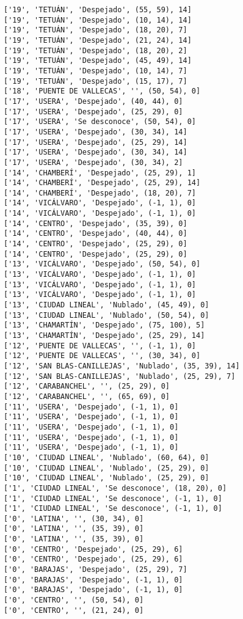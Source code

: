 \documentclass[11pt]{article}
\begin{document}
\begin{Verbatim}[commandchars=\\\{\}]
['19', 'TETUÁN', 'Despejado', (55, 59), 14]
['19', 'TETUÁN', 'Despejado', (10, 14), 14]
['19', 'TETUÁN', 'Despejado', (18, 20), 7]
['19', 'TETUÁN', 'Despejado', (21, 24), 14]
['19', 'TETUÁN', 'Despejado', (18, 20), 2]
['19', 'TETUÁN', 'Despejado', (45, 49), 14]
['19', 'TETUÁN', 'Despejado', (10, 14), 7]
['19', 'TETUÁN', 'Despejado', (15, 17), 7]
['18', 'PUENTE DE VALLECAS', '', (50, 54), 0]
['17', 'USERA', 'Despejado', (40, 44), 0]
['17', 'USERA', 'Despejado', (25, 29), 0]
['17', 'USERA', 'Se desconoce', (50, 54), 0]
['17', 'USERA', 'Despejado', (30, 34), 14]
['17', 'USERA', 'Despejado', (25, 29), 14]
['17', 'USERA', 'Despejado', (30, 34), 14]
['17', 'USERA', 'Despejado', (30, 34), 2]
['14', 'CHAMBERÍ', 'Despejado', (25, 29), 1]
['14', 'CHAMBERÍ', 'Despejado', (25, 29), 14]
['14', 'CHAMBERÍ', 'Despejado', (18, 20), 7]
['14', 'VICÁLVARO', 'Despejado', (-1, 1), 0]
['14', 'VICÁLVARO', 'Despejado', (-1, 1), 0]
['14', 'CENTRO', 'Despejado', (35, 39), 0]
['14', 'CENTRO', 'Despejado', (40, 44), 0]
['14', 'CENTRO', 'Despejado', (25, 29), 0]
['14', 'CENTRO', 'Despejado', (25, 29), 0]
['13', 'VICÁLVARO', 'Despejado', (50, 54), 0]
['13', 'VICÁLVARO', 'Despejado', (-1, 1), 0]
['13', 'VICÁLVARO', 'Despejado', (-1, 1), 0]
['13', 'VICÁLVARO', 'Despejado', (-1, 1), 0]
['13', 'CIUDAD LINEAL', 'Nublado', (45, 49), 0]
['13', 'CIUDAD LINEAL', 'Nublado', (50, 54), 0]
['13', 'CHAMARTÍN', 'Despejado', (75, 100), 5]
['13', 'CHAMARTÍN', 'Despejado', (25, 29), 14]
['12', 'PUENTE DE VALLECAS', '', (-1, 1), 0]
['12', 'PUENTE DE VALLECAS', '', (30, 34), 0]
['12', 'SAN BLAS-CANILLEJAS', 'Nublado', (35, 39), 14]
['12', 'SAN BLAS-CANILLEJAS', 'Nublado', (25, 29), 7]
['12', 'CARABANCHEL', '', (25, 29), 0]
['12', 'CARABANCHEL', '', (65, 69), 0]
['11', 'USERA', 'Despejado', (-1, 1), 0]
['11', 'USERA', 'Despejado', (-1, 1), 0]
['11', 'USERA', 'Despejado', (-1, 1), 0]
['11', 'USERA', 'Despejado', (-1, 1), 0]
['11', 'USERA', 'Despejado', (-1, 1), 0]
['10', 'CIUDAD LINEAL', 'Nublado', (60, 64), 0]
['10', 'CIUDAD LINEAL', 'Nublado', (25, 29), 0]
['10', 'CIUDAD LINEAL', 'Nublado', (25, 29), 0]
['1', 'CIUDAD LINEAL', 'Se desconoce', (18, 20), 0]
['1', 'CIUDAD LINEAL', 'Se desconoce', (-1, 1), 0]
['1', 'CIUDAD LINEAL', 'Se desconoce', (-1, 1), 0]
['0', 'LATINA', '', (30, 34), 0]
['0', 'LATINA', '', (35, 39), 0]
['0', 'LATINA', '', (35, 39), 0]
['0', 'CENTRO', 'Despejado', (25, 29), 6]
['0', 'CENTRO', 'Despejado', (25, 29), 6]
['0', 'BARAJAS', 'Despejado', (25, 29), 7]
['0', 'BARAJAS', 'Despejado', (-1, 1), 0]
['0', 'BARAJAS', 'Despejado', (-1, 1), 0]
['0', 'CENTRO', '', (50, 54), 0]
['0', 'CENTRO', '', (21, 24), 0]

\end{Verbatim}
\end{document}
